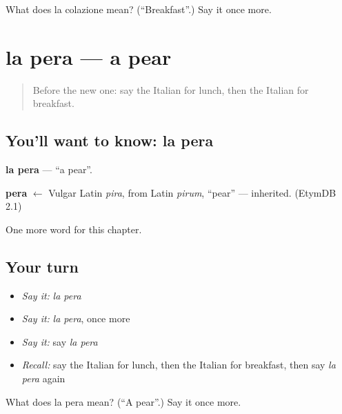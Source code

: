 \begin{tcolorbox}[breakable,colback=teal!4,colframe=teal!35!black,title={Before you move on}]
What does la colazione mean? (\textquotedblleft{}Breakfast\textquotedblright{}.) Say it once more.
\end{tcolorbox}
\section[la pera]{la pera — a pear}

\label{lesson:IT-C55-pera}



\begin{quote}
Before the new one: say the Italian for lunch, then the Italian for breakfast.
\end{quote}

\subsection*{You'll want to know: la pera}
\textbf{la pera} — \textquotedblleft{}a pear\textquotedblright{}.

\begin{cousinweb}
\textbf{pera} $\leftarrow$ Vulgar Latin \emph{pira}, from Latin \emph{pirum}, \textquotedblleft{}pear\textquotedblright{} — inherited. (EtymDB 2.1)
\end{cousinweb}

\begin{grammarlens}[title={What you've built}]
One more word for this chapter.
\end{grammarlens}

\subsection*{Your turn}
\begin{itemize}
\raggedright
  \item \emph{Say it:} \emph{la pera}
  \item \emph{Say it:} \emph{la pera}, once more
  \item \emph{Say it:} say \emph{la pera}
  \item \emph{Recall:} say the Italian for lunch, then the Italian for breakfast, then say \emph{la pera} again
\end{itemize}

\begin{tcolorbox}[breakable,colback=teal!4,colframe=teal!35!black,title={Before you move on}]
What does la pera mean? (\textquotedblleft{}A pear\textquotedblright{}.) Say it once more.
\end{tcolorbox}
